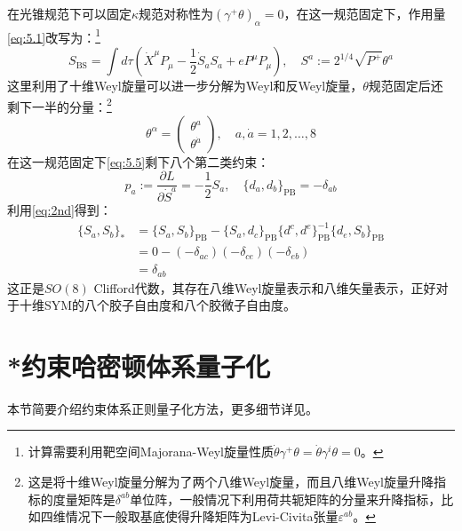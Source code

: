 在光锥规范下可以固定$\kappa$规范对称性为$(\gamma^+\theta)_\alpha=0$，在这一规范固定下，作用量\ref{eq:5.1}改写为：\footnote{计算需要利用靶空间Majorana-Weyl旋量性质$\dot{\theta}\gamma^+\theta=\dot{\theta}\gamma^i\theta=0$。}
\begin{equation}
S_{\text{BS}}=\int d\tau\left(\dot{X}^\mu P_\mu-\frac{1}{2}\dot{S}_aS_a+eP^\mu P_\mu\right),\quad S^a:=2^{1/4}\sqrt{P^+}\theta^a
\end{equation}
这里利用了十维Weyl旋量可以进一步分解为Weyl和反Weyl旋量，$\theta$规范固定后还剩下一半的分量：\footnote{这是将十维Weyl旋量分解为了两个八维Weyl旋量，而且八维Weyl旋量升降指标的度量矩阵是$\delta^{ab}$单位阵，一般情况下利用荷共轭矩阵的分量来升降指标\cite{Freedman:2012zz}，比如四维情况下一般取基底使得升降矩阵为Levi-Civita张量$\varepsilon^{ab}$。}
\begin{equation}
	\theta^\alpha=\begin{pmatrix}\theta^a\\\theta^{\dot{a}}\end{pmatrix},\quad a,\dot{a}=1,2,\ldots,8
\end{equation}
在这一规范固定下\ref{eq:5.5}剩下八个第二类约束：
\begin{equation}
	p_a:=\frac{\partial L}{\partial\dot{S}^a}=-\frac{1}{2}S_a,\quad \{d_a,d_b\}_{\mathrm{PB}}=-\delta_{ab}
\end{equation}
利用\ref{eq:2nd}得到：
\begin{equation}
	\label{eq:5.10}
	\begin{aligned}
		\{S_a,S_b\}_*&=\{S_a,S_b\}_{\mathrm{PB}}-\{S_a,d_c\}_{\mathrm{PB}}\{d^c,d^e\}_{\mathrm{PB}}^{-1}\{d_e,S_b\}_{\mathrm{PB}}\\&=0-(-\delta_{ac})(-\delta_{ce})(-\delta_{eb})\\&=\delta_{ab}
	\end{aligned}
\end{equation}
这正是$SO(8)$ Clifford代数，其存在八维Weyl旋量表示和八维矢量表示，正好对于十维SYM的八个胶子自由度和八个胶微子自由度。
\section{*约束哈密顿体系量子化}
\label{sec:5.2}
本节简要介绍约束体系正则量子化方法，更多细节详见\cite{lcb,dirac}。

